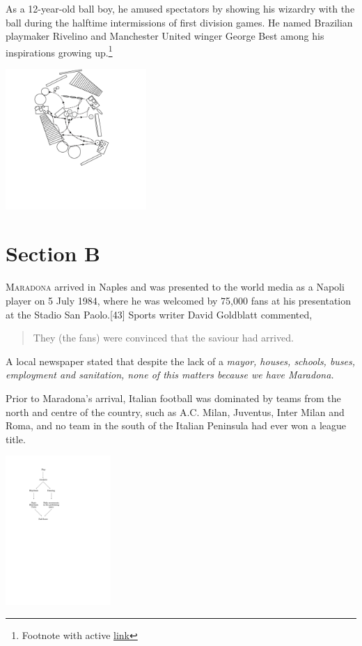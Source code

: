 \documentclass[oneside]{article}
\begin{document}
\begin{multicols*}{2}
As a 12-year-old ball boy, he amused spectators by showing his wizardry with the ball during the halftime intermissions of first division games. He named Brazilian playmaker Rivelino and Manchester United winger George Best among his inspirations growing up.\footnote{Footnote with active \href{<https://www.rte.ie/sport/soccer/2005/1126/198627-bestg/>}{link}}

\includegraphics[width=0.4\textwidth]{img/percussions.pdf}


\section{Section B}

	
\lettrine{M}{aradona} arrived in Naples and was presented to the world media as a Napoli player on 5 July 1984, where he was welcomed by 75,000 fans at his presentation at the Stadio San Paolo.[43] Sports writer David Goldblatt commented, 
\begin{quote}
They (the fans) were convinced that the saviour had arrived.
\end{quote} 

A local newspaper stated that despite the lack of a \emph{mayor, houses, schools, buses, employment and sanitation, none of this matters because we have Maradona.} 

Prior to Maradona's arrival, Italian football was dominated by teams from the north and centre of the country, such as A.C. Milan, Juventus, Inter Milan and Roma, and no team in the south of the Italian Peninsula had ever won a league title.

\begin{center}
\includegraphics[width=0.3\textwidth]{img/schema.pdf}
 \end{center}
 

\end{multicols*}
\end{document}
